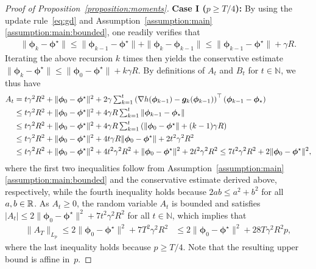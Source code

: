 \documentclass[11pt, a4paper, oneside, reqno]{article}
\begin{document}
\begin{proof}[Proof of Proposition~\ref{proposition:moments}]
		
		\textbf{Case I ($p \geq T / 4$):}
		By using the update rule~\eqref{eq:gd} and Assumption~\ref{assumption:main}\,\ref{assumption:main:bounded}, one readily verifies that
		\begin{align*}
		    \| \bm \phi_k - \bm \phi^\star \| 
		    \leq \| \bm \phi_{k-1} - \bm \phi^\star \| + \| \bm \phi_k - \bm \phi_{k-1} \| 
		    \leq \| \bm \phi_{k-1} - \bm \phi^\star \| + \gamma R.
		\end{align*}
		 Iterating the above recursion $k$ times then yields the conservative estimate $\| \bm \phi_k - \bm \phi^\star \|\leq \| \bm \phi_{0} - \bm \phi^\star \| + k \gamma R$. By definitions of $A_t$ and $B_t$ for $t\in\mathbb N$, we thus have
		\begin{align*}
		    A_t 
		    &\textstyle
		    = t \gamma^2 R^2 + \| \bm \phi_{0} - \bm \phi^\star \|^2 + 2 \gamma \sum_{k=1}^t \left( \nabla h(\bm \phi_{k-1}) - \bm g_k(\bm \phi_{k-1}) \right)^\top (\bm \phi_{k-1} - \bm \phi_{\star}) \\
		    &\textstyle
		    \leq t \gamma^2 R^2 + \| \bm \phi_{0} - \bm \phi^\star \|^2 + 4 \gamma R \sum_{k=1}^t \| \bm \phi_{k-1} - \bm \phi_{\star} \| \\
		    &\textstyle
		    \leq t \gamma^2 R^2 + \| \bm \phi_{0} - \bm \phi^\star \|^2 + 4 \gamma R \sum_{k=1}^t \left( \| \bm \phi_{0} - \bm \phi^\star \| + (k-1) \gamma R \right) \\
		    &\leq t \gamma^2 R^2 + \| \bm \phi_0 - \bm \phi^\star \|^2 + 4 t \gamma R \| \bm \phi_0 - \bm \phi^\star \| + 2 t^2 \gamma^2 R^2 \notag \\
		    &\leq t \gamma^2 R^2 + \| \bm \phi_0 - \bm \phi^\star \|^2 + 4 t^2 \gamma^2 R^2 + \| \bm \phi_0 - \bm \phi^\star \|^2 + 2 t^2 \gamma^2 R^2 \leq 7 t^2 \gamma^2 R^2 + 2 \| \bm \phi_0 - \bm \phi^\star \|^2,
		\end{align*}
		where the first two inequalities follow from Assumption~\ref{assumption:main}\,\ref{assumption:main:bounded} and the conservative estimate derived above, respectively, while the fourth inequality holds because $2 a b \leq a^2 + b^2$ for all $a,b\in\mathbb{R}$. As $A_t \geq 0$, the random variable $A_t$ is bounded and satisfies $| A_t| \leq 2 \| \bm \phi_0 - \bm \phi^\star \|^2 + 7 t^2 \gamma^2 R^2$ for all $t\in\mathbb N$, which implies that
		\begin{align}
		\label{eq:bound:A:T/4}
		\| A_T \|_{L_p} 
		\leq 2 \| \bm \phi_0 - \bm \phi^\star \|^2 + 7 T^2 \gamma^2 R^2
		&\leq 2 \| \bm \phi_0 - \bm \phi^\star \|^2 + 28 T \gamma^2 R^2 p,
		\end{align}
		where the last inequality holds because $p \geq T/4$. Note that the resulting upper bound is affine in~$p$.
		

\end{proof}
\end{document}
